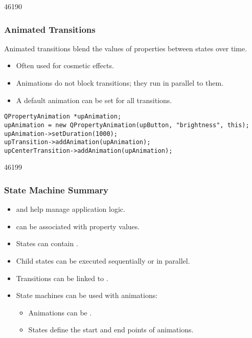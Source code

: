 \begin{slide}[fragile]{46190}\frametitle{Animated Transitions}
\label{Animation-Animated-Transitions}
Animated transitions blend the values of properties between states over time.

\begin{itemize}
\item Often used for cosmetic effects.
\item Animations do not block transitions; they run in parallel to them.
\item A default animation can be set for all transitions.
\end{itemize}

\small
\begin{lstlisting}
QPropertyAnimation *upAnimation;
upAnimation = new QPropertyAnimation(upButton, "brightness", this);
upAnimation->setDuration(1000);
upTransition->addAnimation(upAnimation);
upCenterTransition->addAnimation(upAnimation);
\end{lstlisting}
\normalsize
{}

\end{slide}

\begin{slide}{46199}\frametitle{State Machine Summary}

\vspace*{1.5em}
\begin{itemize}
\item {} and
 help
manage application logic.
\item {} can be associated
with property values.
\item States can contain .
\item Child states can be executed sequentially or in parallel.
\item Transitions can be linked to .

\item State machines can be used with animations:
\begin{itemize}
\item Animations can be .
\item States define the start and end points of animations.
\end{itemize}
\end{itemize}
\end{slide}

